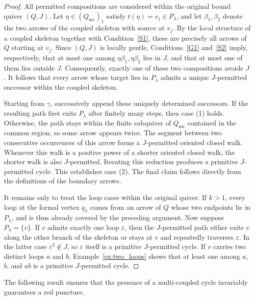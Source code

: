 \documentclass[11pt]{amsart}
\numberwithin{equation}{section}
\theoremstyle{definition}
\begin{document}
\begin{proof}
All permitted compositions are considered within the original bound quiver \((Q,J)\). Let \(\eta\in(Q_{\mathrm{mc}})_1\) satisfy \(t(\eta)=v_j\in P_\lambda\), and let \(\beta_1,\beta_2\) denote the two arrows of the coupled skeleton with source at \(v_j\). By the local structure of a coupled skeleton together with Condition~\ref{S1}, these are precisely all arrows of \(Q\) starting at \(v_j\). Since \((Q,J)\) is locally gentle, Conditions~\ref{G1} and~\ref{S2} imply, respectively, that at most one among \(\eta\beta_1,\eta\beta_2\) lies in \(J\), and that at most one of them lies outside \(J\). Consequently, exactly one of these two compositions avoids \(J\). It follows that every arrow whose target lies in \(P_\lambda\) admits a unique \(J\)-permitted successor within the coupled skeleton.

Starting from \(\gamma\), successively append these uniquely determined successors. If the resulting path first exits \(P_\lambda\) after finitely many steps, then case (1) holds. Otherwise, the path stays within the finite subquiver of \(Q_{\mathrm{mc}}\) contained in the common region, so some arrow appears twice. The segment between two consecutive occurrences of this arrow forms a \(J\)-permitted oriented closed walk. Whenever this walk is a positive power of a shorter oriented closed walk, the shorter walk is also \(J\)-permitted. Iterating this reduction produces a primitive \(J\)-permitted cycle. This establishes case (2). The final claim follows directly from the definitions of the boundary arrows.

It remains only to treat the loop cases within the original quiver. If \(k>1\), every loop at the formal vertex \(q_\lambda\) comes from an arrow of \(Q\) whose two endpoints lie in \(P_\lambda\), and is thus already covered by the preceding argument. Now suppose \(P_\lambda=\{v\}\). If \(v\) admits exactly one loop \(\varepsilon\), then the \(J\)-permitted path either exits \(v\) along the other branch of the skeleton or stays at \(v\) and repeatedly traverses \(\varepsilon\). In the latter case \(\varepsilon^2\notin J\), so \(\varepsilon\) itself is a primitive \(J\)-permitted cycle. If \(v\) carries two distinct loops \(a\) and \(b\), Example~\ref{ex:two_loops} shows that at least one among \(a\), \(b\), and \(ab\) is a primitive \(J\)-permitted cycle.
\end{proof}

The following result ensures that the presence of a multi-coupled cycle invariably guarantees a red puncture.
\end{document}
